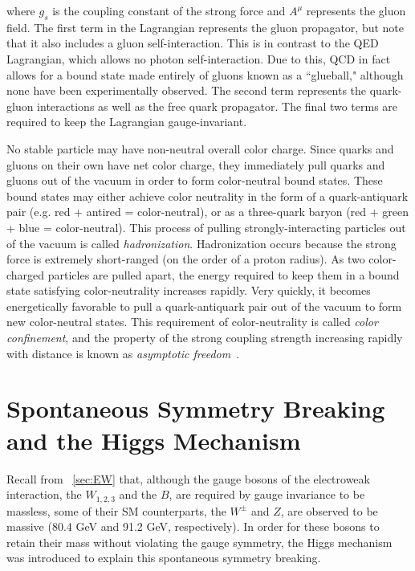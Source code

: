 \noindent where $g_{s}$ is the coupling constant of the strong force and $A^{\mu}$ represents the gluon field. The first term in the Lagrangian represents the gluon propagator, but note that it also includes a gluon self-interaction. This is in contrast to the QED Lagrangian, which allows no photon self-interaction. Due to this, QCD in fact allows for a bound state made entirely of gluons known as a ``glueball," although none have been experimentally observed. The second term represents the quark-gluon interactions as well as the free quark propagator. The final two terms are required to keep the Lagrangian gauge-invariant.

No stable particle may have non-neutral overall color charge. Since quarks and gluons on their own have net color charge, they immediately pull quarks and gluons out of the vacuum in order to form color-neutral bound states. These bound states may either achieve color neutrality in the form of a quark-antiquark pair (e.g. red + antired = color-neutral), or as a three-quark baryon (red + green + blue = color-neutral). This process of pulling strongly-interacting particles out of the vacuum is called \textit{hadronization}. Hadronization occurs because the strong force is extremely short-ranged (on the order of a proton radius). As two color-charged particles are pulled apart, the energy required to keep them in a bound state satisfying color-neutrality increases rapidly. Very quickly, it becomes energetically favorable to pull a quark-antiquark pair out of the vacuum to form new color-neutral states. This requirement of color-neutrality is called \textit{color confinement}, and the property of the strong coupling strength increasing rapidly with distance is known as \textit{asymptotic freedom}~\cite{halzen}.


\section{Spontaneous Symmetry Breaking and the Higgs Mechanism}

Recall from ~\ref{sec:EW} that, although the gauge bosons of the electroweak interaction, the $W_{1,2,3}$ and the $B$, are required by gauge invariance to be massless, some of their SM counterparts, the $W^{\pm}$ and $Z$, are observed to be massive (80.4 GeV and 91.2 GeV, respectively). In order for these bosons to retain their mass without violating the gauge symmetry, the Higgs mechanism was introduced to explain this spontaneous symmetry breaking.

